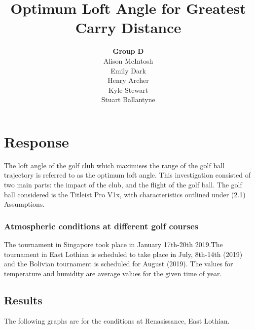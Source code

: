 \documentclass[12pt]{article}
\title{\textbf{Optimum Loft Angle for Greatest Carry Distance}}
\author{\textbf{Group D}\\
		Alison McIntosh\\
		Emily Dark\\
		Henry Archer\\
		Kyle Stewart\\
		Stuart Ballantyne}
\date{}
\begin{document}
\begin{titlepage}
\maketitle
\thispagestyle{empty}
\pagebreak
\end{titlepage}


\section{Response}
The loft angle of the golf club which maximises the range of the golf ball trajectory is referred to as the optimum loft angle. This investigation consisted of two main parts: the impact of the club, and the flight of the golf ball. The golf ball considered is the Titleist Pro V1x, with characteristics outlined under (2.1) Assumptions.

\subsubsection{Atmospheric conditions at different golf courses}
\begin{table}[H]
\caption{Atmospheric conditions at each golf course}
\label{tab:aconditions}
\end{table}

The tournament in Singapore took place in January 17th-20th 2019.The tournament in East Lothian is scheduled to take place in July, 8th-14th (2019) and the Bolivian tournament is scheduled for August (2019). The values for temperature and humidity are average values for the given time of year.

\subsection{Results}
The following graphs are for the conditions at Renasissance, East Lothian.
\end{document}

